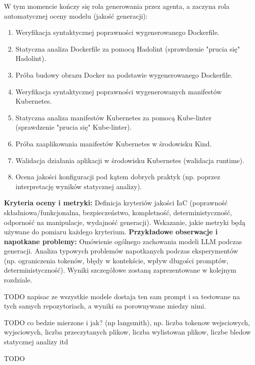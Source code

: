 W tym momencie kończy się rola generowania przez agenta, a zaczyna rola automatycznej oceny modelu (jakość generacji): \begin{enumerate}[resume] \item Weryfikacja syntaktycznej poprawności wygenerowanego Dockerfile. \item Statyczna analiza Dockerfile za pomocą Hadolint (sprawdzenie "prucia się" Hadolint). \item Próba budowy obrazu Docker na podstawie wygenerowanego Dockerfile. \item Weryfikacja syntaktycznej poprawności wygenerowanych manifestów Kubernetes. \item Statyczna analiza manifestów Kubernetes za pomocą Kube-linter (sprawdzenie "prucia się" Kube-linter). \item Próba zaaplikowania manifestów Kubernetes w środowisku Kind. \item Walidacja działania aplikacji w środowisku Kubernetes (walidacja runtime). \item Ocena jakości konfiguracji pod kątem dobrych praktyk (np. poprzez interpretację wyników statycznej analizy). \end{enumerate}
\textbf{Kryteria oceny i metryki:}
Definicja kryteriów jakości IaC (poprawność składniowa/funkcjonalna, bezpieczeństwo, kompletność, deterministyczność, odporność na manipulacje, wydajność generacji).
Wskazanie, jakie metryki będą używane do pomiaru każdego kryterium.
\textbf{Przykładowe obserwacje i napotkane problemy:}
Omówienie ogólnego zachowania modeli LLM podczas generacji.
Analiza typowych problemów napotkanych podczas eksperymentów (np. ograniczenia tokenów, błędy w kontekście, wpływ długości promptów, deterministyczność).
Wyniki szczegółowe zostaną zaprezentowane w kolejnym rozdziale.

TODO napisac ze wszystkie modele dostaja ten sam prompt i sa testowane na tych samych repozytoriach, a wyniki sa porownywane miedzy nimi.

TODO co bedzie mierzone i jak? (np langsmith), np. liczba tokenow wejsciowych, wyjsciowych, liczba przeczytanych plikow, liczba wylistowan plikow, liczbe bledow statycznej analizy itd

TODO